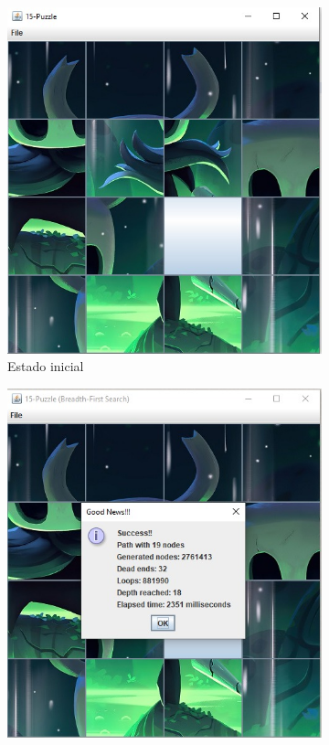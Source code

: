         \begin{figure}[!h]
          \centering
          \begin{subfigure}{0.3\textwidth}
            \includegraphics[width=\textwidth]{Imagenes/rev.jpg}
            \caption{Estado inicial}
          \end{subfigure}
          \hfill
          \begin{subfigure}{0.3\textwidth}
            \includegraphics[width=\textwidth]{Imagenes/bfs1.jpg}

\end{subfigure}
\end{figure}
